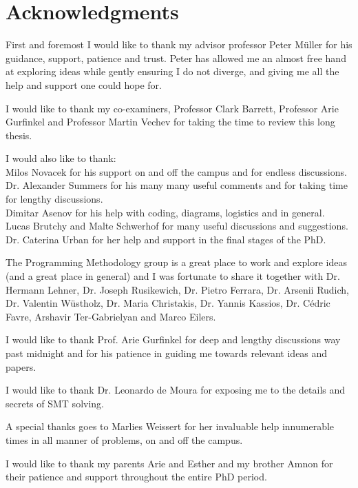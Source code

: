 \chapter*{Acknowledgments}

First and foremost I would like to thank my advisor professor Peter M{\"u}ller for his guidance, support, patience and trust. Peter has allowed me an almost free hand at exploring ideas while gently ensuring I do not diverge, and giving me all the help and support one could hope for.

I would like to thank my co-examiners, Professor Clark Barrett, Professor Arie Gurfinkel and Professor Martin Vechev for taking the time to review this long thesis.

I would also like to thank:\\
Milos Novacek for his support on and off the campus and for endless discussions.\\
Dr. Alexander Summers for his many many useful comments and for taking time for lengthy discussions.\\
Dimitar Asenov for his help with coding, diagrams, logistics and in general.\\
Lucas Brutchy and Malte Schwerhof for many useful discussions and suggestions.\\
Dr. Caterina Urban for her help and support in the final stages of the PhD.

The Programming Methodology group is a great place to work and explore ideas (and a great place in general) and I was fortunate to share it together with Dr. Hermann Lehner, Dr. Joseph Rusikewich, Dr. Pietro Ferrara, Dr. Arsenii Rudich, Dr. Valentin Wüstholz, Dr. Maria Christakis, Dr. Yannis Kassios, Dr. Cédric Favre, Arshavir Ter-Gabrielyan and Marco Eilers.

I would like to thank Prof. Arie Gurfinkel for deep and lengthy discussions way past midnight and for his patience in guiding me towards relevant ideas and papers.

I would like to thank Dr. Leonardo de Moura for exposing me to the details and secrets of SMT solving.

A special thanks goes to Marlies Weissert for her invaluable help innumerable times in all manner of problems, on and off the campus.

I would like to thank my parents Arie and Esther and my brother Amnon for their patience and support throughout the entire PhD period.




\newpage
